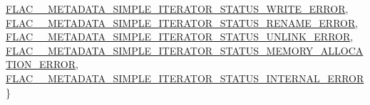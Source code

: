 \begin{DoxyCompactItemize}
\newline
\mbox{\hyperlink{group__flac__metadata__level1_ggac926e7d2773a05066115cac9048bbec9ac2337299c2347ca311caeaa7d71d857c}{F\+L\+A\+C\+\_\+\+\_\+\+M\+E\+T\+A\+D\+A\+T\+A\+\_\+\+S\+I\+M\+P\+L\+E\+\_\+\+I\+T\+E\+R\+A\+T\+O\+R\+\_\+\+S\+T\+A\+T\+U\+S\+\_\+\+W\+R\+I\+T\+E\+\_\+\+E\+R\+R\+OR}}, 
\mbox{\hyperlink{group__flac__metadata__level1_ggac926e7d2773a05066115cac9048bbec9a2e073843fa99419d76a0b210da96ceb6}{F\+L\+A\+C\+\_\+\+\_\+\+M\+E\+T\+A\+D\+A\+T\+A\+\_\+\+S\+I\+M\+P\+L\+E\+\_\+\+I\+T\+E\+R\+A\+T\+O\+R\+\_\+\+S\+T\+A\+T\+U\+S\+\_\+\+R\+E\+N\+A\+M\+E\+\_\+\+E\+R\+R\+OR}}, 
\mbox{\hyperlink{group__flac__metadata__level1_ggac926e7d2773a05066115cac9048bbec9a4f855433038c576da127fc1de9d18f9b}{F\+L\+A\+C\+\_\+\+\_\+\+M\+E\+T\+A\+D\+A\+T\+A\+\_\+\+S\+I\+M\+P\+L\+E\+\_\+\+I\+T\+E\+R\+A\+T\+O\+R\+\_\+\+S\+T\+A\+T\+U\+S\+\_\+\+U\+N\+L\+I\+N\+K\+\_\+\+E\+R\+R\+OR}}, 
\mbox{\hyperlink{group__flac__metadata__level1_ggac926e7d2773a05066115cac9048bbec9aa8386ed0a20d7e91b0022d203ec3cdec}{F\+L\+A\+C\+\_\+\+\_\+\+M\+E\+T\+A\+D\+A\+T\+A\+\_\+\+S\+I\+M\+P\+L\+E\+\_\+\+I\+T\+E\+R\+A\+T\+O\+R\+\_\+\+S\+T\+A\+T\+U\+S\+\_\+\+M\+E\+M\+O\+R\+Y\+\_\+\+A\+L\+L\+O\+C\+A\+T\+I\+O\+N\+\_\+\+E\+R\+R\+OR}}, 
\newline
\mbox{\hyperlink{group__flac__metadata__level1_ggac926e7d2773a05066115cac9048bbec9a9d821ae65a1c5de619daa88c850906df}{F\+L\+A\+C\+\_\+\+\_\+\+M\+E\+T\+A\+D\+A\+T\+A\+\_\+\+S\+I\+M\+P\+L\+E\+\_\+\+I\+T\+E\+R\+A\+T\+O\+R\+\_\+\+S\+T\+A\+T\+U\+S\+\_\+\+I\+N\+T\+E\+R\+N\+A\+L\+\_\+\+E\+R\+R\+OR}}
 \}
\end{DoxyCompactItemize}
